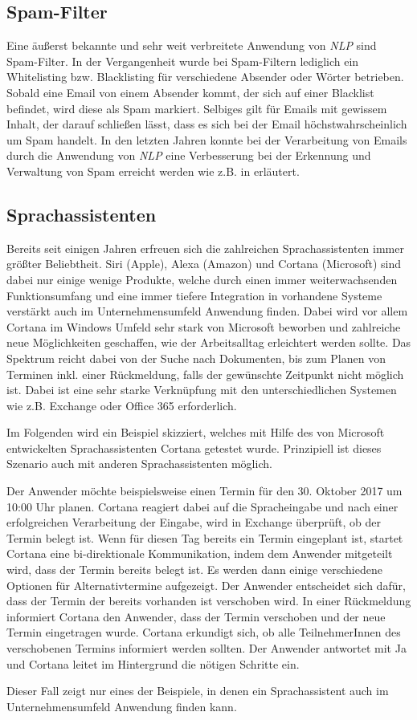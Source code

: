 \subsection{Spam-Filter}
Eine äußerst bekannte und sehr weit verbreitete Anwendung von \textit{NLP} sind Spam-Filter. In der Vergangenheit wurde bei Spam-Filtern lediglich ein Whitelisting bzw. Blacklisting für verschiedene Absender oder Wörter betrieben. Sobald eine Email von einem Absender kommt, der sich auf einer Blacklist befindet, wird diese als Spam markiert. Selbiges gilt für Emails mit gewissem Inhalt, der darauf schließen lässt, dass es sich bei der Email höchstwahrscheinlich um Spam handelt. In den letzten Jahren konnte bei der Verarbeitung von Emails durch die Anwendung von \textit{NLP} eine Verbesserung bei der Erkennung und Verwaltung von Spam erreicht werden wie z.B. in \cite{Rohit2014} erläutert. 

\subsection{Sprachassistenten}
Bereits seit einigen Jahren erfreuen sich die zahlreichen Sprachassistenten immer größter Beliebtheit. Siri (Apple), Alexa (Amazon) und Cortana (Microsoft) sind dabei nur einige wenige Produkte, welche durch einen immer weiterwachsenden Funktionsumfang und eine immer tiefere Integration in vorhandene Systeme verstärkt auch im Unternehmensumfeld Anwendung finden. Dabei wird vor allem Cortana im Windows Umfeld sehr stark von Microsoft beworben und zahlreiche neue Möglichkeiten geschaffen, wie der Arbeitsalltag erleichtert werden sollte. Das Spektrum reicht dabei von der Suche nach Dokumenten, bis zum Planen von Terminen inkl. einer Rückmeldung, falls der gewünschte Zeitpunkt nicht möglich ist. Dabei ist eine sehr starke Verknüpfung mit den unterschiedlichen Systemen wie z.B. Exchange oder Office 365 erforderlich. 

Im Folgenden wird ein Beispiel skizziert, welches mit Hilfe des von Microsoft entwickelten Sprachassistenten Cortana getestet wurde. Prinzipiell ist dieses Szenario auch mit anderen Sprachassistenten möglich.

Der Anwender möchte beispielsweise einen Termin für den 30. Oktober 2017 um 10:00 Uhr planen. Cortana reagiert dabei auf die Spracheingabe und nach einer erfolgreichen Verarbeitung der Eingabe, wird in Exchange überprüft, ob der Termin belegt ist. Wenn für diesen Tag bereits ein Termin eingeplant ist, startet Cortana eine bi-direktionale Kommunikation, indem dem Anwender mitgeteilt wird, dass der Termin bereits belegt ist. Es werden dann einige verschiedene Optionen für Alternativtermine aufgezeigt. Der Anwender entscheidet sich dafür, dass der Termin der bereits vorhanden ist verschoben wird. In einer Rückmeldung informiert Cortana den Anwender, dass der Termin verschoben und der neue Termin eingetragen wurde. Cortana erkundigt sich, ob alle TeilnehmerInnen des verschobenen Termins informiert werden sollten. Der Anwender antwortet mit Ja und Cortana leitet im Hintergrund die nötigen Schritte ein.

Dieser Fall zeigt nur eines der Beispiele, in denen ein Sprachassistent auch im Unternehmensumfeld Anwendung finden kann. 



